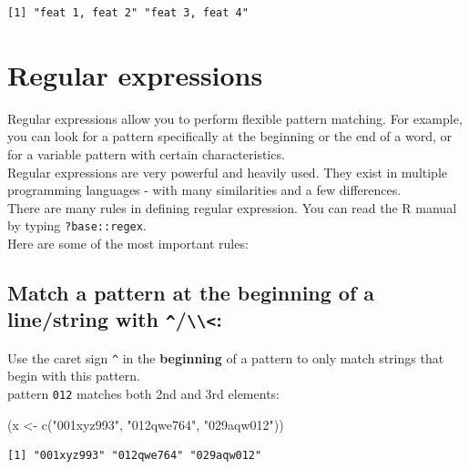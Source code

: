 \documentclass[
]{book}
\newenvironment{Shaded}{\begin{snugshade}}{\end{snugshade}}
\newcommand{\FunctionTok}[1]{\textcolor[rgb]{0.00,0.00,0.00}{#1}}
\newcommand{\NormalTok}[1]{#1}
\newcommand{\OtherTok}[1]{\textcolor[rgb]{0.56,0.35,0.01}{#1}}
\newcommand{\StringTok}[1]{\textcolor[rgb]{0.31,0.60,0.02}{#1}}
\begin{document}
\begin{verbatim}
[1] "feat 1, feat 2" "feat 3, feat 4"
\end{verbatim}

\hypertarget{regular-expressions}{%
\section{Regular expressions}\label{regular-expressions}}

Regular expressions allow you to perform flexible pattern matching. For example, you can look for a pattern specifically at the beginning or the end of a word, or for a variable pattern with certain characteristics.\\
Regular expressions are very powerful and heavily used. They exist in multiple programming languages - with many similarities and a few differences.\\
There are many rules in defining regular expression. You can read the R manual by typing \texttt{?base::regex}.\\
Here are some of the most important rules:

\hypertarget{match-a-pattern-at-the-beginning-of-a-linestring-with}{%
\subsection{\texorpdfstring{Match a pattern at the beginning of a line/string with \texttt{\^{}}/\texttt{\textbackslash{}\textbackslash{}\textless{}}:}{Match a pattern at the beginning of a line/string with \^{}/\textbackslash\textbackslash\textless:}}\label{match-a-pattern-at-the-beginning-of-a-linestring-with}}

Use the caret sign \texttt{\^{}} in the \textbf{beginning} of a pattern to only match strings that begin with this pattern.\\
pattern \texttt{012} matches both 2nd and 3rd elements:

\begin{Shaded}
\begin{Highlighting}[]
\NormalTok{(x }\OtherTok{\textless{}{-}} \FunctionTok{c}\NormalTok{(}\StringTok{"001xyz993"}\NormalTok{, }\StringTok{"012qwe764"}\NormalTok{, }\StringTok{"029aqw012"}\NormalTok{))}
\end{Highlighting}
\end{Shaded}

\begin{verbatim}
[1] "001xyz993" "012qwe764" "029aqw012"
\end{verbatim}
\end{document}
